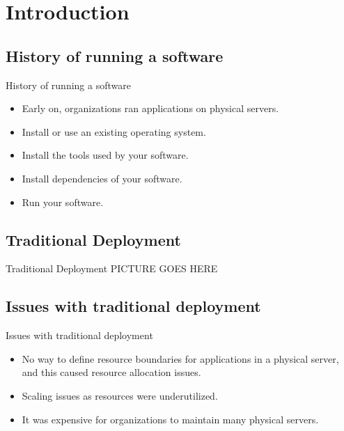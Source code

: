 

\section{Introduction}\label{sec:introduction}

\subsection{History of running a software}\label{subsec:history-of-running-a-software}
\begin{frame}{History of running a software}
    \begin{itemize}
        \item Early on, organizations ran applications on physical servers.
        \item Install or use an existing operating system.
        \item Install the tools used by your software.
        \item Install dependencies of your software.
        \item Run your software.
    \end{itemize}
\end{frame}

\subsection{Traditional Deployment}\label{subsec:traditional-deployment}
\begin{frame}{Traditional Deployment}
    PICTURE GOES HERE
\end{frame}

\subsection{Issues with traditional deployment}\label{subsec:issues-with-traditional-deployment}
\begin{frame}{Issues with traditional deployment}
    \begin{itemize}
        \item No way to define resource boundaries for applications in a physical server, and this caused resource allocation issues.
        \item Scaling issues as resources were underutilized.
        \item It was expensive for organizations to maintain many physical servers.
    \end{itemize}
\end{frame}

